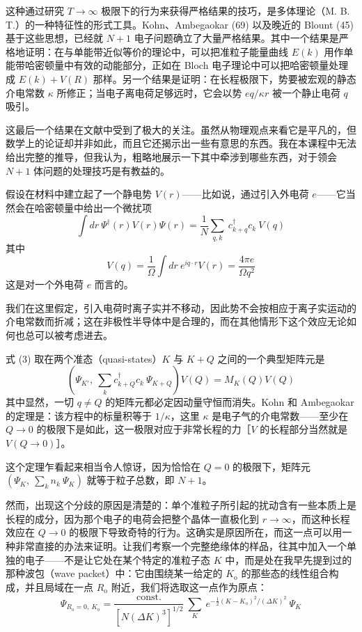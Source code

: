 这种通过研究 $T\to\infty$ 极限下的行为来获得严格结果的技巧，是多体理论（M. B. T.）的一种特征性的形式工具。Kohn、Ambegaokar (69) 以及晚近的 Blount (45) 基于这些思想，已经就 $N+1$ 电子问题确立了大量严格结果。其中一个结果是严格地证明：在与单能带近似等价的理论中，可以把准粒子能量曲线 $E(k)$ 用作单能带哈密顿量中有效的动能部分，正如在 Bloch 电子理论中可以把哈密顿量处理成 $E(k)+V(R)$ 那样。另一个结果是证明：在长程极限下，势要被宏观的静态介电常数 $\kappa$ 所修正；当电子离电荷足够远时，它会以势 $eq/\kappa r$ 被一个静止电荷 $q$ 吸引。

这最后一个结果在文献中受到了极大的关注。虽然从物理观点来看它是平凡的，但数学上的论证却并非如此，而且它还揭示出一些有意思的东西。我在本课程中无法给出完整的推导，但我认为，粗略地展示一下其中牵涉到哪些东西，对于领会 $N+1$ 体问题的处理技巧是有教益的。

假设在材料中建立起了一个静电势 $V(r)$——比如说，通过引入外电荷 $e$——它当然会在哈密顿量中给出一个微扰项
\begin{equation*}
\int dr\ \Psi^{\dagger}(r)V(r)\Psi(r) = \frac{1}{N}\sum_{q,k}\ c^{\dagger}_{k+q}c_{k}\ V(q) \tag{3}
\end{equation*}
其中
\begin{equation*}
V(q) = \frac{1}{\Omega}\int dr\ e^{iq\cdot r}V(r) = \frac{4\pi e}{\Omega q^{2}}
\end{equation*}
这是对一个外电荷 $e$ 而言的。

我们在这里假定，引入电荷时离子实并不移动，因此势不会按相应于离子实运动的介电常数而折减；这在非极性半导体中是合理的，而在其他情形下这个效应无论如何也总可以被考虑进去。

式 (3) 取在两个准态（quasi-states）$K$ 与 $K+Q$ 之间的一个典型矩阵元是
\begin{equation*}
\left(\Psi_{K'},\ \sum_{k}c^{\dagger}_{k+Q}c_{k}\ \Psi_{K+Q}\right)V(Q) = M_{K}(Q)V(Q)
\end{equation*}
其中显然，一切 $q\neq Q$ 的矩阵元都必定因动量守恒而消失。Kohn 和 Ambegaokar 的定理是：该方程中的标量积等于 $1/\kappa$，这里 $\kappa$ 是电子气的介电常数——至少在 $Q\to 0$ 的极限下是如此，这一极限对应于非常长程的力［$V$ 的长程部分当然就是 $V(Q\to 0)$］。

这个定理乍看起来相当令人惊讶，因为恰恰在 $Q=0$ 的极限下，矩阵元 $\left(\Psi_{K},\ \sum_{k}n_{k}\ \Psi_{K}\right)$ 就等于粒子总数，即 $N+1$。

然而，出现这个分歧的原因是清楚的：单个准粒子所引起的扰动含有一些本质上是长程的成分，因为那个电子的电荷会把整个晶体一直极化到 $r\to\infty$，而这种长程效应在 $Q\to 0$ 的极限下导致奇特的行为。这确实是原因所在，而这一点可以用一种非常直接的办法来证明。让我们考察一个完整绝缘体的样品，往其中加入一个单独的电子——不是让它处在某个特定的准粒子态 $K$ 中，而是处在我早先提到过的那种波包（wave packet）中：它由围绕某一给定的 $K_{\mathrm{o}}$ 的那些态的线性组合构成，并且局域在一点 $R_{\mathrm{o}}$ 附近，我们将选取这一点作为原点：
\begin{equation*}
\Psi_{R_{\mathrm{o}}=0,\ K_{\mathrm{o}}} = \frac{\text{const.}}{\left[N(\Delta K)^{3}\right]^{1/2}}\ \sum_{K}\ e^{-\frac{1}{2}(K-K_{\mathrm{o}})^{2}/(\Delta K)^{2}}\ \Psi_{K} \tag{4}
\end{equation*}


